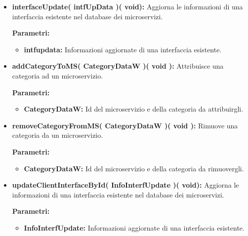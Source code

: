 \begin{itemize}
\begin{itemize}
			\item \textbf{interfaceUpdate( intfUpData )( void):} Aggiorna le informazioni di una interfaccia esistente nel database dei microservizi.
			\begin{description}
				\item[\textbf{Parametri:}]
			\end{description}
			\begin{itemize}
				\item \textbf{intfupdata:} Informazioni aggiornate di una interfaccia esistente.
			\end{itemize}
			
			\item \textbf{addCategoryToMS( CategoryDataW )( void ):} Attribuisce una categoria ad un microservizio.
			\begin{description}
				\item[\textbf{Parametri:}]
			\end{description}
			\begin{itemize}
				\item \textbf{CategoryDataW:} Id del microservizio e della categoria da attribuirgli.
			\end{itemize}
		
			\item \textbf{removeCategoryFromMS( CategoryDataW )( void ):} Rimuove una categoria da un microservizio.
			\begin{description}
				\item[\textbf{Parametri:}]
			\end{description}
			\begin{itemize}
				\item \textbf{CategoryDataW:} Id del microservizio e della categoria da rimuovergli.
			\end{itemize}
		
			\item \textbf{updateClientInterfaceById( InfoInterfUpdate )( void):} Aggiorna le informazioni di una interfaccia esistente nel database dei microservizi.
			\begin{description}
				\item[\textbf{Parametri:}]
			\end{description}
			\begin{itemize}
				\item \textbf{InfoInterfUpdate:} Informazioni aggiornate di una interfaccia esistente.
			\end{itemize}
		

\end{itemize}
\end{itemize}
